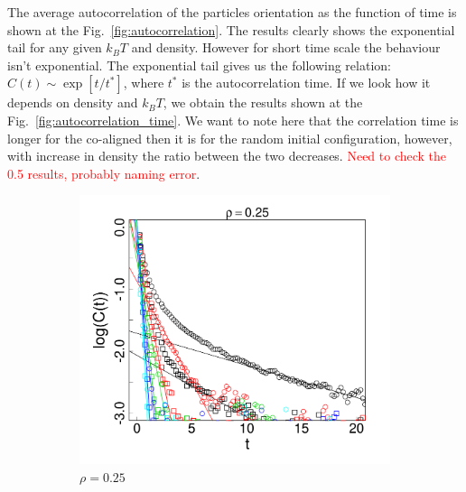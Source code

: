 The average autocorrelation of the particles orientation as the function of time is shown at the Fig.~\ref{fig:autocorrelation}. The results clearly shows the exponential tail for any given $k_BT$ and density. However for short time scale the behaviour isn't exponential. The exponential tail gives us the following relation: $C(t) \sim \exp[t/t^*]$, where $t^*$ is the autocorrelation time. If we look how it depends on density and $k_BT$, we obtain the results shown at the Fig.~\ref{fig:autocorrelation_time}. We want to note here that the correlation time is longer for the co-aligned then it is for the random initial configuration, however, with increase in density the ratio between the two decreases. \textcolor{red}{Need to check the 0.5 results, probably naming error}.

\begin{figure}[p]
\centering
	\begin{subfigure}[t]{0.49\textwidth}
		\centering
		\includegraphics[width=\textwidth]{Images/corr_time_relaxation_25.png}
		\caption{$\rho = 0.25$}
	\end{subfigure}
	\begin{subfigure}[t]{0.49\textwidth}
		\centering

\end{subfigure}
\end{figure}
